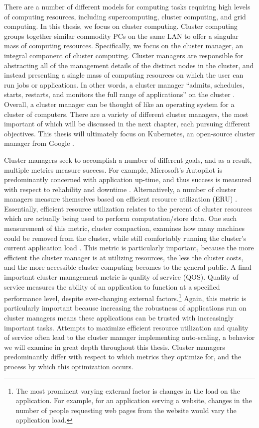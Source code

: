 There are a number of different models for computing tasks requiring high levels
of computing resources, including supercomputing, cluster computing, and grid
computing. In this thesis, we focus on cluster computing. Cluster computing
groups together similar commodity PCs on the same LAN to offer a singular mass
of computing resources. Specifically, we focus on the
cluster manager, an integral component of cluster computing. Cluster managers
are responsible for abstracting all of the management details of the distinct
nodes in the cluster, and instead presenting a single mass of computing resources
on which the user can run jobs or applications. In other words,
a cluster manager ``admits, schedules, starts, restarts, and monitors the full
range of applications'' on the cluster \cite{borg}. Overall, a cluster
manager can be thought of like an operating system for a cluster of computers. There are a
variety of different cluster managers, the most important of which will be
discussed in the next chapter, each pursuing different objectives. This
thesis will ultimately focus on Kubernetes, an open-source cluster
manager from Google \cite{k8s-website}.

Cluster managers seek to accomplish a number of different goals, and as a
result, multiple metrics measure success. For example, Microsoft's Autopilot is
predominantly concerned with application up-time, and thus success is measured
with respect to reliability and downtime \cite{autopilot}.
Alternatively, a number of cluster managers measure themselves based on
efficient resource utilization (ERU) \cite{borg}. Essentially, efficient
resource utilization relates to the percent of cluster resources which are
actually being used to perform computation/store data.
One such measurement of this metric, cluster
compaction, examines how many machines could be removed from the cluster, while
still comfortably running the cluster's current application load
\cite{evaluating-job-packing-in-warehouse-scale-computing}. This metric is
particularly important, because the more efficient the cluster manager is at
utilizing resources, the less the cluster costs, and the more accessible cluster
computing becomes to the general public. A final important
cluster management metric is quality of service (QOS). Quality of service measures the
ability of an application to function at a specified
performance level, despite ever-changing
external factors.\footnote{The most prominent varying external factor is changes
in the load on the application. For example, for an application serving a
website, changes in the number of people requesting web pages from the website
would vary the application load.} Again, this metric is particularly important because
increasing the robustness of applications run on cluster managers means
these applications can be trusted with increasingly important tasks. Attempts to
maximize efficient resource utilization and quality of service
often lead to the cluster manager implementing
auto-scaling, a behavior we will examine in great depth throughout this thesis. Cluster
managers predominantly differ with respect to which metrics they optimize
for, and the process by which this optimization occurs.


